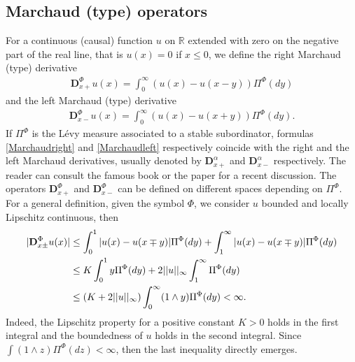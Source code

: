 \documentclass[11pt,a4paper]{article}
\theoremstyle{plain}
\theoremstyle{definition}
\theoremstyle{remark}
\begin{document}
	\subsection{Marchaud (type) operators}
	\label{sec:Marchaud}
	For a continuous (causal) function $u$ on $\mathbb{R}$ extended with zero on the negative part of the real line, that is $u(x)=0$ if $x \leq 0$, we define the right Marchaud (type) derivative
	\begin{align}
		\label{Marchaudright}
		\mathbf{D}_{x+}^\Phi u(x)=\int_0^\infty (u(x) - u(x-y))\Pi^\Phi(dy)
	\end{align}
	and the left  Marchaud (type) derivative
	\begin{align}
		\label{Marchaudleft}
		\mathbf{D}_{x-}^\Phi u(x) = \int_0^\infty (u(x) - u(x+y))\Pi^\Phi(dy).
	\end{align}
	If $\Pi^\Phi$ is the L\'evy measure associated to a stable subordinator, formulas \eqref{Marchaudright} and \eqref{Marchaudleft} respectively coincide with the right and the left Marchaud derivatives, usually denoted by $\mathbf{D}_{x+}^\alpha$ and $\mathbf{D}_{x-}^\alpha$ respectively. The reader can consult the famous book \cite[formula (5.57) and (5.58)]{samko1993fractional} or the paper \cite[section 6.1]{ferrari2018weyl} for a recent discussion. The operators $\mathbf{D}_{x+}^\Phi$ and $\mathbf{D}_{x-}^\Phi$ can be defined on different spaces depending on $\Pi^\Phi$. For a general definition, given the symbol $\Phi$, we consider $u$  bounded and locally Lipschitz continuous, then
	\begin{align}
		\label{stimaMarchaud}
		\vert \mathbf{D}_{x\pm}^\Phi u(x) \vert &\leq \int_0^1 \vert u(x) -u(x\mp y) \vert \Pi^\Phi(dy) + \int_1^\infty \vert u(x) -u(x\mp y) \vert \Pi^\Phi(dy) \notag \\
		&\leq K \int_0^1 y \Pi^\Phi(dy) + 2 \vert\vert u \vert \vert_\infty \int_1^\infty \Pi^\Phi(dy) \notag \\
		&\leq(K+2 \vert \vert u \vert \vert_\infty) \int_0^\infty (1 \wedge y) \Pi^\Phi(dy) <\infty.
	\end{align}
	Indeed, the Lipschitz property for a positive constant $K>0$ holds in the first integral and the boundedness of $u$ holds in the second integral. Since $\int (1 \wedge z) \Pi^\Phi(dz) < \infty$, then the last inequality directly emerges. 
	
\end{document}
